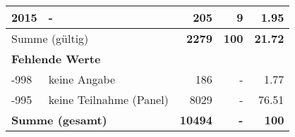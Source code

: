 \begin{longtable}{lXrrr}
     2015 &
     \multicolumn{1}{X}{ -  } &


       \num{205} &
       \num[round-mode=places,round-precision=2]{9} &
         \num[round-mode=places,round-precision=2]{1,95} \\
     \midrule
     \multicolumn{2}{l}{Summe (gültig)} &
       \textbf{\num{2279}} &
     \textbf{100} &
       \textbf{\num[round-mode=places,round-precision=2]{21,72}} \\
     \multicolumn{5}{l}{\textbf{Fehlende Werte}}\\
       -998 &
       keine Angabe &
         \num{186} &
        - &
         \num[round-mode=places,round-precision=2]{1,77} \\
       -995 &
       keine Teilnahme (Panel) &
         \num{8029} &
        - &
         \num[round-mode=places,round-precision=2]{76,51} \\
     \midrule
     \multicolumn{2}{l}{\textbf{Summe (gesamt)}} &
          \textbf{\num{10494}} &
        \textbf{-} &
        \textbf{100} \\
     \bottomrule
     \end{longtable}
     
